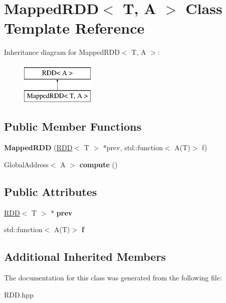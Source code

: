 \hypertarget{class_mapped_r_d_d}{}\section{Mapped\+R\+D\+D$<$ T, A $>$ Class Template Reference}
\label{class_mapped_r_d_d}
Inheritance diagram for Mapped\+R\+D\+D$<$ T, A $>$\+:\begin{figure}[H]
\begin{center}
\leavevmode
\includegraphics[height=2.000000cm]{class_mapped_r_d_d}
\end{center}
\end{figure}
\subsection*{Public Member Functions}
\begin{DoxyCompactItemize}
\item 
\hypertarget{class_mapped_r_d_d_a4926bf8d96b3aa0d7e8d2ce2ea3ae71c}{}{\bfseries Mapped\+R\+D\+D} (\hyperlink{class_r_d_d}{R\+D\+D}$<$ T $>$ $\ast$prev, std\+::function$<$ A(T)$>$ f)\label{class_mapped_r_d_d_a4926bf8d96b3aa0d7e8d2ce2ea3ae71c}

\item 
\hypertarget{class_mapped_r_d_d_a4f6d501824803f296effe1da1155cb62}{}Global\+Address$<$ A $>$ {\bfseries compute} ()\label{class_mapped_r_d_d_a4f6d501824803f296effe1da1155cb62}

\end{DoxyCompactItemize}
\subsection*{Public Attributes}
\begin{DoxyCompactItemize}
\item 
\hypertarget{class_mapped_r_d_d_a24c0005ebdadd20729034f12f5ea95fc}{}\hyperlink{class_r_d_d}{R\+D\+D}$<$ T $>$ $\ast$ {\bfseries prev}\label{class_mapped_r_d_d_a24c0005ebdadd20729034f12f5ea95fc}

\item 
\hypertarget{class_mapped_r_d_d_a0793f60e9e6a3d6433f207a7fd277fd2}{}std\+::function$<$ A(T)$>$ {\bfseries f}\label{class_mapped_r_d_d_a0793f60e9e6a3d6433f207a7fd277fd2}

\end{DoxyCompactItemize}
\subsection*{Additional Inherited Members}


The documentation for this class was generated from the following file\+:\begin{DoxyCompactItemize}
\item 
R\+D\+D.\+hpp\end{DoxyCompactItemize}
